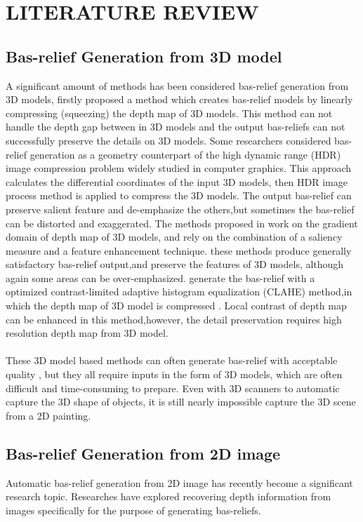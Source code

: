 \chapter{LITERATURE REVIEW}

\section{Bas-relief Generation from 3D model}
A significant amount of methods has been considered bas-relief generation from 3D models,\cite{cignoni1997computer} firstly proposed a method which  creates bas-relief models by linearly compressing (squeezing) the
depth map of 3D models. This method can not handle the depth gap between in 3D models and the output bas-reliefs can not successfully preserve the  details on 3D models. 
Some researchers considered bas-relief generation as a geometry counterpart of the  high dynamic range (HDR) image compression problem widely studied in computer graphics\cite{song2007automatic}. This approach calculates the differential coordinates of the input 3D models, then HDR image process method is applied to compress the 3D models. The output bas-relief can preserve salient feature and de-emphasize the others,but sometimes the bas-relief can be distorted and exaggerated. 
The methods proposed in \cite{kerber2009feature}\cite{kerber2012computer} work on the gradient domain of depth map of 3D models, and rely on the combination of a saliency measure and a feature enhancement technique. these methods produce generally satisfactory bas-relief output,and preserve the features of 3D models, although again some areas can be over-emphasized. 
\cite{sun2009bas} generate the bas-relief with a optimized contrast-limited adaptive histogram equalization (CLAHE) method,in which the depth map of 3D model is compressed . Local contrast of depth map can be enhanced in this method,however, the detail preservation requires high resolution depth map from 3D model. \\ \\ 
These 3D model based methods can often generate bas-relief with acceptable quality , but they all require inputs in the form of 3D models, which are often difficult and time-consuming to prepare. Even with 3D scanners to automatic capture the 3D shape of objects, it is still nearly impossible capture the 3D scene from a 2D painting. 

\section{Bas-relief Generation from 2D image}
Automatic bas-relief generation from 2D image has recently become a significant research topic. Researches have explored recovering depth information from images specifically for the purpose of generating bas-reliefs.\newline
